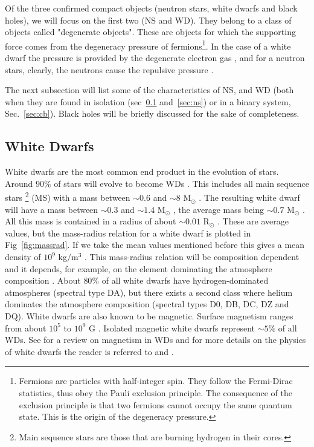 Of the three confirmed compact objects (neutron stars, white dwarfs and black holes), we will focus on the first two (NS and WD). They belong to a class of objects called "degenerate objects". These are objects for which the supporting force comes from the degeneracy pressure of fermions\footnote{Fermions are particles with half-integer spin. They follow the Fermi-Dirac statistics, thus obey the Pauli exclusion principle. The consequence of the exclusion principle is that two fermions cannot occupy the same quantum state. This is the origin of the degeneracy pressure. }. In the case of a white dwarf the pressure is provided by the degenerate electron gas \citep{fowler_dense_1926}, and for a neutron stars, clearly, the neutrons cause the repulsive pressure \citep{1939PhRv...55..374O}. 

The next subsection will list some of the characteristics of NS, and WD (both when they are found in isolation (sec~\ref{sec:wd} and~\ref{sec:ns}) or in a binary system, Sec.~\ref{sec:cb}). Black holes will be briefly discussed for the sake of completeness. 


\subsection[White Dwarfs]{White Dwarfs}\label{sec:wd} 

White dwarfs are the most common end product in the evolution of stars. Around $90 \%$ of stars will evolve to become WDs \citep{koester_white_1980}. This includes all main sequence stars \footnote{Main sequence stars are those that are burning hydrogen in their cores.} (MS) with a mass between $\sim 0.6$ and  $\sim 8$ M$_\odot$ \citep{koester_physics_1990}. The resulting white dwarf will have a mass between $\sim 0.3$ and $\sim 1.4$ M$_\odot$ \citep{prada_moroni_very_2009,chandrasekhar_maximum_1931}, the average mass being $\sim 0.7$ M$_\odot$ \citep{koester_physics_1990}. All this mass is contained in a radius of about $\sim 0.01$ R$_\odot$ \citep{kepler_structure_1995}. These are average values, but the mass-radius relation for a white dwarf is plotted in Fig~\ref{fig:massrad}. If we take the mean values mentioned before this gives a mean density of $10^9$ kg$/$m$^3$ . This mass-radius relation will be composition dependent and it depends, for example, on the element dominating the atmosphere composition \citep{hamada_models_1961}. About $80 \%$ of all white dwarfs have hydrogen-dominated atmospheres (spectral type DA), but there exists a second class where helium dominates the atmosphere composition (spectral types D0, DB, DC, DZ and DQ)\citep{wickramasinghe_magnetism_2000,koester_physics_1990}. White dwarfs are also known to be magnetic. Surface magnetism ranges from about $10^5$ to $10^9$ G \citep{suh_mass-radius_2000}. Isolated magnetic white dwarfs represent $\sim 5 \%$ of all WDs. See \cite{wickramasinghe_magnetism_2000} for a review on magnetism in WDs and for more details on the physics of white dwarfs the reader is referred to \cite{koester_physics_1990} and \cite{kepler_structure_1995}.

